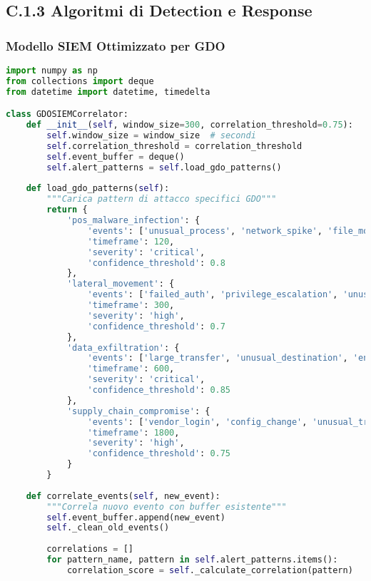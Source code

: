 \subsection{C.1.3 Algoritmi di Detection e Response}

\subsubsection{Modello SIEM Ottimizzato per GDO}

\begin{lstlisting}[language=Python, caption=Algoritmo di Correlazione Eventi SIEM]
import numpy as np
from collections import deque
from datetime import datetime, timedelta

class GDOSIEMCorrelator:
    def __init__(self, window_size=300, correlation_threshold=0.75):
        self.window_size = window_size  # secondi
        self.correlation_threshold = correlation_threshold
        self.event_buffer = deque()
        self.alert_patterns = self.load_gdo_patterns()
        
    def load_gdo_patterns(self):
        """Carica pattern di attacco specifici GDO"""
        return {
            'pos_malware_infection': {
                'events': ['unusual_process', 'network_spike', 'file_modification'],
                'timeframe': 120,
                'severity': 'critical',
                'confidence_threshold': 0.8
            },
            'lateral_movement': {
                'events': ['failed_auth', 'privilege_escalation', 'unusual_access'],
                'timeframe': 300,
                'severity': 'high',
                'confidence_threshold': 0.7
            },
            'data_exfiltration': {
                'events': ['large_transfer', 'unusual_destination', 'encryption_activity'],
                'timeframe': 600,
                'severity': 'critical',
                'confidence_threshold': 0.85
            },
            'supply_chain_compromise': {
                'events': ['vendor_login', 'config_change', 'unusual_traffic'],
                'timeframe': 1800,
                'severity': 'high',
                'confidence_threshold': 0.75
            }
        }
    
    def correlate_events(self, new_event):
        """Correla nuovo evento con buffer esistente"""
        self.event_buffer.append(new_event)
        self._clean_old_events()
        
        correlations = []
        for pattern_name, pattern in self.alert_patterns.items():
            correlation_score = self._calculate_correlation(pattern)
            

\end{lstlisting}
